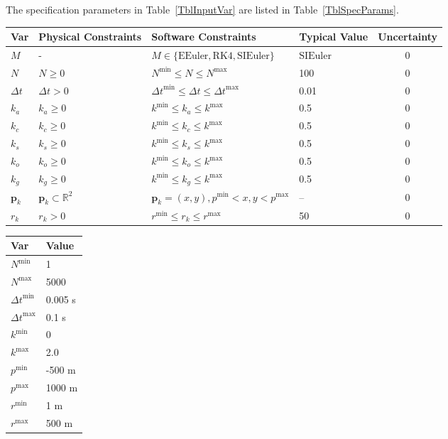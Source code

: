 \documentclass[12pt]{article}
\begin{document}
The specification parameters in Table~\ref{TblInputVar} are listed in
Table~\ref{TblSpecParams}.

\begin{table}[!h]
  \caption{Input Variables} \label{TblInputVar}
  \renewcommand{\arraystretch}{1.2}
\noindent \begin{longtable*}{l l l l c} 
  \toprule
  \textbf{Var} & \textbf{Physical Constraints} & \textbf{Software Constraints} &
                             \textbf{Typical Value} & \textbf{Uncertainty}\\
  \midrule 
  $M$ & - & $M \in \{\text{EEuler}, \text{RK4}, \text{SIEuler}\}$ & $\text{SIEuler}$ & 0\\
  $N$ & $N \geq 0$ & $N^{\text{min}} \leq N \leq N^{\text{max}}$ & 100 & 0\\
  $\Delta t$ & $\Delta t > 0$ & ${\Delta t}^{\text{min}} \leq \Delta t \leq {\Delta t}^{\text{max}}$ & 0.01 & 0\\
  $k_a$ & $k_a \geq 0$ & $k^{\text{min}} \leq k_a \leq k^{\text{max}}$ & 0.5 & 0\\
  $k_c$ & $k_c \geq 0$ & $k^{\text{min}} \leq k_c \leq k^{\text{max}}$ & 0.5 & 0\\
  $k_s$ & $k_s \geq 0$ & $k^{\text{min}} \leq k_s \leq k^{\text{max}}$ & 0.5 & 0\\
  $k_o$ & $k_o \geq 0$ & $k^{\text{min}} \leq k_o \leq k^{\text{max}}$ & 0.5 & 0\\
  $k_g$ & $k_g \geq 0$ & $k^{\text{min}} \leq k_g \leq k^{\text{max}}$ & 0.5 & 0\\
  $\mathbf{p}_k$ & $\mathbf{p}_k \subset \mathbb{R}^2$ & $\mathbf{p}_k = (x, y), p^{\text{min}} < x, y < p^{\text{max}}$ & -- & 0\\
  $r_k$ & $r_k > 0$ & $r^{\text{min}} \leq r_k \leq r^{\text{max}}$ & 50 & 0\\
  \bottomrule
\end{longtable*}
\end{table}

\begin{table}[!h]
\caption{Specification Parameter Values} \label{TblSpecParams}
\renewcommand{\arraystretch}{1.2}
\noindent \begin{longtable*}{l l} 
  \toprule
  \textbf{Var} & \textbf{Value} \\
  \midrule 
  $N^{\text{min}}$ & 1\\
  $N^{\text{max}}$ & 5000\\
  ${\Delta t}^{\text{min}}$ & 0.005 \si{\second}\\
  ${\Delta t}^{\text{max}}$ & 0.1 \si{\second}\\
  $k^{\text{min}}$ & 0\\
  $k^{\text{max}}$ & 2.0\\
  $p^{\text{min}}$ & -500 \si{\metre}\\
  $p^{\text{max}}$ & 1000 \si{\metre}\\
  $r^{\text{min}}$ & 1 \si{\metre}\\
  $r^{\text{max}}$ & 500 \si{\metre}\\
  \bottomrule
\end{longtable*}
\end{table}
\end{document}
